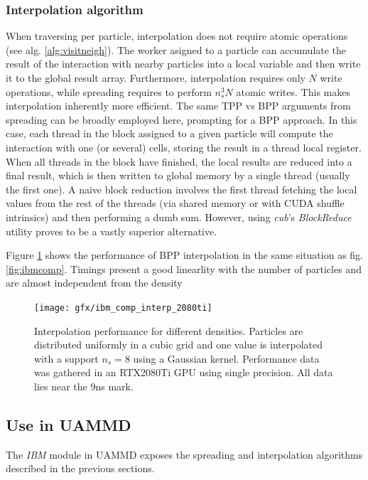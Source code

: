\documentclass[ twoside,openright,titlepage,numbers=noenddot,%
headinclude,footinclude,cleardoublepage=empty,abstract=on,
BCOR=5mm,paper=a4,fontsize=11pt, dvipsnames
]{scrreprt}
\newcommand{\uammd}{\gls{UAMMD}\xspace}
\newcommand{\gpu}{\gls{GPU}\xspace}
\begin{document}
\subsubsection*{Interpolation algorithm}
When traversing per particle, interpolation does not require atomic operations (see alg. \ref{alg:visitneigh}). The worker asigned to a particle can accumulate the result of the interaction with nearby particles into a local variable and then write it to the global result array. Furthermore, interpolation requires only $N$ write operations, while spreading requires to perform $n_s^3N$ atomic writes. This makes interpolation inherently more efficient.
The same TPP vs BPP arguments from spreading can be broadly employed here, prompting for a BPP approach. In this case, each thread in the block assigned to a given particle will compute the interaction with one (or several) cells, storing the result in a thread local register.
When all threads in the block have finished, the local results are reduced into a final result, which is then written to global memory by a single thread (usually the first one).
A naive block reduction involves the first thread fetching the local values from the rest of the threads (via shared memory or with CUDA shuffle intrinsics) and then performing a dumb sum. However, using \emph{cub}'s\cite{cub} \emph{BlockReduce} utility proves to be a vastly superior alternative.

Figure \ref{fig:ibmcompinterp} shows the performance of BPP interpolation in the same situation as fig. \ref{fig:ibmcomp}. Timings present a good linearlity with the number of particles and are almost independent from the density 
\begin{figure}[h]
  \centering
\texttt{[image: gfx/ibm\_comp\_interp\_2080ti]}
\caption{Interpolation performance for different densities. Particles are distributed uniformly in a cubic grid and one value is interpolated with a support $n_s=8$ using a Gaussian kernel. Performance data was gathered in an RTX2080Ti \gpu using single precision. All data lies near the 9ns mark.}
  \label{fig:ibmcompinterp}
\end{figure}

\subsection{Use in UAMMD}

The \emph{IBM} module in \uammd exposes the spreading and interpolation algorithms described in the previous sections.
\end{document}
